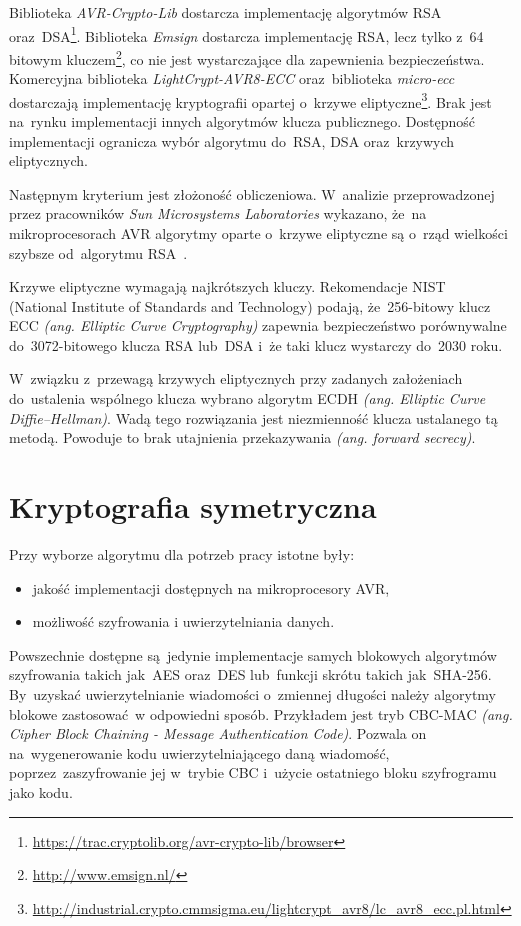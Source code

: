 Biblioteka \emph{AVR-Crypto-Lib} dostarcza implementację algorytmów RSA oraz~DSA\footnote{\url{https://trac.cryptolib.org/avr-crypto-lib/browser}}. Biblioteka \emph{Emsign} dostarcza implementację RSA, lecz tylko z~64 bitowym kluczem\footnote{\url{http://www.emsign.nl/}}, co nie jest wystarczające dla zapewnienia bezpieczeństwa. Komercyjna biblioteka \emph{LightCrypt-AVR8-ECC} oraz~biblioteka \emph{micro-ecc} dostarczają implementację kryptografii opartej o~krzywe eliptyczne\footnote{\url{http://industrial.crypto.cmmsigma.eu/lightcrypt_avr8/lc_avr8_ecc.pl.html}}. Brak jest na~rynku implementacji innych algorytmów klucza publicznego. Dostępność implementacji ogranicza wybór algorytmu do~RSA, DSA oraz~krzywych eliptycznych.

Następnym kryterium jest złożoność obliczeniowa. W~analizie przeprowadzonej przez pracowników \emph{Sun Microsystems Laboratories} wykazano, że~na mikroprocesorach AVR algorytmy oparte o~krzywe eliptyczne są o~rząd wielkości szybsze od~algorytmu RSA~\cite{Gura2004}.

Krzywe eliptyczne wymagają najkrótszych kluczy. Rekomendacje NIST~\cite{Nist} (National Institute of Standards and Technology) podają, że~256-bitowy klucz ECC \emph{(ang. Elliptic Curve Cryptography)} zapewnia bezpieczeństwo porównywalne do~3072-bitowego klucza RSA lub~DSA i~że taki klucz wystarczy do~2030 roku.

W~związku z~przewagą krzywych eliptycznych przy zadanych założeniach do~ustalenia wspólnego klucza wybrano algorytm ECDH \emph{(ang. Elliptic Curve Diffie--Hellman)}. Wadą tego rozwiązania jest niezmienność klucza ustalanego tą metodą. Powoduje to brak utajnienia przekazywania \emph{(ang. forward secrecy)}.

\section{Kryptografia symetryczna}
\label{sec:kryptoSym}

Przy wyborze algorytmu dla potrzeb pracy istotne były:

\begin{itemize}
\item jakość implementacji dostępnych na mikroprocesory AVR,
\item możliwość szyfrowania i uwierzytelniania danych.
\end{itemize}

Powszechnie dostępne są jedynie implementacje samych blokowych algorytmów szyfrowania takich jak~AES oraz~DES lub~funkcji skrótu takich jak~SHA-256. By~uzyskać uwierzytelnianie wiadomości o~zmiennej długości należy algorytmy blokowe zastosować w odpowiedni sposób. Przykładem jest tryb CBC-MAC {\itshape (ang. Cipher Block Chaining - Message Authentication Code)}. Pozwala on na~wygenerowanie kodu uwierzytelniającego daną wiadomość, poprzez~zaszyfrowanie jej w~trybie CBC i~użycie ostatniego bloku szyfrogramu jako kodu.

